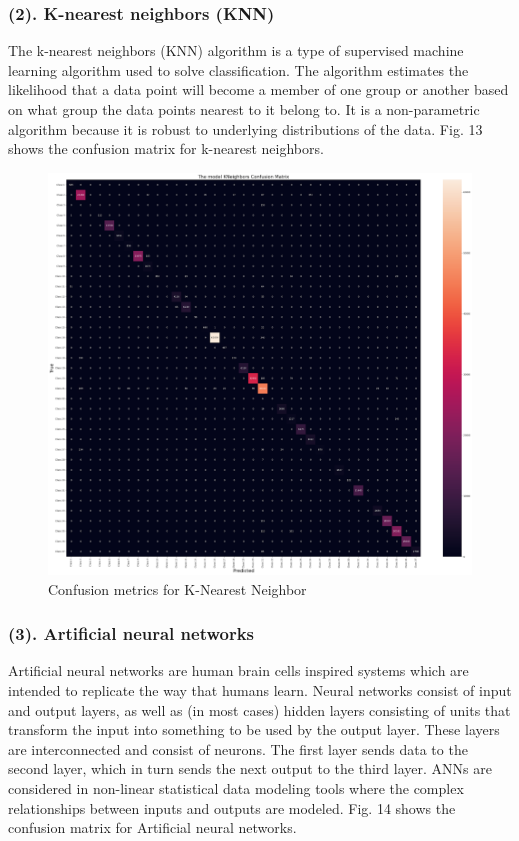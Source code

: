 \documentclass[conference,final, 10pt]{IEEEtran}
\begin{document}
\subsubsection{(2). K-nearest neighbors
(KNN)}\label{k-nearest-neighbors-knn}

The k-nearest neighbors (KNN) algorithm is a type of supervised machine
learning algorithm used to solve classification. The algorithm estimates
the likelihood that a data point will become a member of one group or
another based on what group the data points nearest to it belong to. It
is a non-parametric algorithm because it is robust to underlying
distributions of the data. Fig. 13 shows the confusion matrix for
k-nearest neighbors.

\begin{figure}

{\centering \includegraphics[width=0.9\linewidth]{img/fig13} 

}

\caption{Confusion metrics for K-Nearest Neighbor}\label{fig:unnamed-chunk-13}
\end{figure}

\subsubsection{(3). Artificial neural
networks}\label{artificial-neural-networks}

Artificial neural networks are human brain cells inspired systems which
are intended to replicate the way that humans learn. Neural networks
consist of input and output layers, as well as (in most cases) hidden
layers consisting of units that transform the input into something to be
used by the output layer. These layers are interconnected and consist of
neurons. The first layer sends data to the second layer, which in turn
sends the next output to the third layer. ANNs are considered in
non-linear statistical data modeling tools where the complex
relationships between inputs and outputs are modeled. Fig. 14 shows the
confusion matrix for Artificial neural networks.
\end{document}
